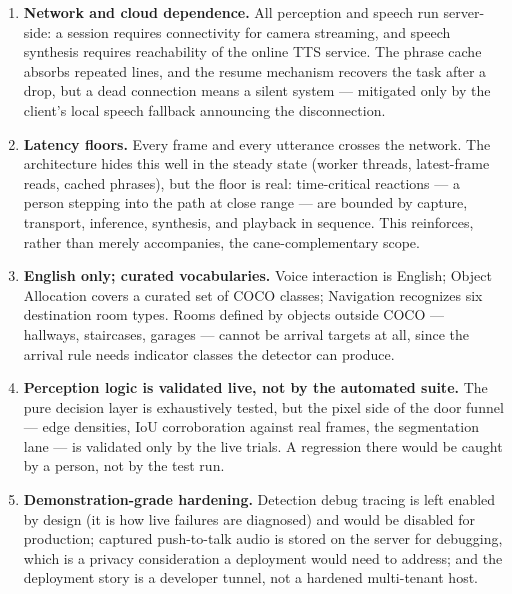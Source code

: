 \begin{enumerate}[nosep]
  \item \textbf{Network and cloud dependence.} All perception and speech run
        server-side: a session requires connectivity for camera streaming, and
        speech synthesis requires reachability of the online TTS service. The
        phrase cache absorbs repeated lines, and the resume mechanism recovers
        the task after a drop, but a dead connection means a silent system ---
        mitigated only by the client's local speech fallback announcing the
        disconnection.
  \item \textbf{Latency floors.} Every frame and every utterance crosses the
        network. The architecture hides this well in the steady state (worker
        threads, latest-frame reads, cached phrases), but the floor is real:
        time-critical reactions --- a person stepping into the path at close
        range --- are bounded by capture, transport, inference, synthesis, and
        playback in sequence. This reinforces, rather than merely accompanies,
        the cane-complementary scope.
  \item \textbf{English only; curated vocabularies.} Voice interaction is
        English; Object Allocation covers a curated set of COCO classes;
        Navigation recognizes six destination room types. Rooms defined by
        objects outside COCO --- hallways, staircases, garages --- cannot be
        arrival targets at all, since the arrival rule needs indicator classes
        the detector can produce.
  \item \textbf{Perception logic is validated live, not by the automated
        suite.} The pure decision layer is exhaustively tested, but the pixel
        side of the door funnel --- edge densities, IoU corroboration against
        real frames, the segmentation lane --- is validated only by the live
        trials. A regression there would be caught by a person, not by the test
        run.
  \item \textbf{Demonstration-grade hardening.} Detection debug tracing is left
        enabled by design (it is how live failures are diagnosed) and would be
        disabled for production; captured push-to-talk audio is stored on the
        server for debugging, which is a privacy consideration a deployment
        would need to address; and the deployment story is a developer tunnel,
        not a hardened multi-tenant host.
\end{enumerate}


